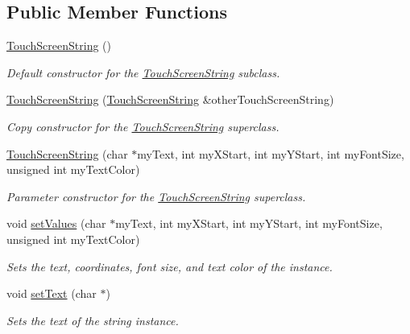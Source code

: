 \subsection*{Public Member Functions}
\begin{DoxyCompactItemize}
\item 
\hypertarget{class_touch_screen_string_ac6041c6c845b2286efee96cbc4b5473f}{\hyperlink{class_touch_screen_string_ac6041c6c845b2286efee96cbc4b5473f}{Touch\+Screen\+String} ()}\label{class_touch_screen_string_ac6041c6c845b2286efee96cbc4b5473f}

\begin{DoxyCompactList}\small\item\em Default constructor for the \hyperlink{class_touch_screen_string}{Touch\+Screen\+String} subclass. \end{DoxyCompactList}\item 
\hyperlink{class_touch_screen_string_a32ccd512fd5ef6a1aefa14d1e7552afb}{Touch\+Screen\+String} (\hyperlink{class_touch_screen_string}{Touch\+Screen\+String} \&other\+Touch\+Screen\+String)
\begin{DoxyCompactList}\small\item\em Copy constructor for the \hyperlink{class_touch_screen_string}{Touch\+Screen\+String} superclass. \end{DoxyCompactList}\item 
\hyperlink{class_touch_screen_string_a225634c4816f8988343c9a9491cf27fb}{Touch\+Screen\+String} (char $\ast$my\+Text, int my\+X\+Start, int my\+Y\+Start, int my\+Font\+Size, unsigned int my\+Text\+Color)
\begin{DoxyCompactList}\small\item\em Parameter constructor for the \hyperlink{class_touch_screen_string}{Touch\+Screen\+String} superclass. \end{DoxyCompactList}\item 
void \hyperlink{class_touch_screen_string_ad797bc5369aaace58de46bca39ae83dd}{set\+Values} (char $\ast$my\+Text, int my\+X\+Start, int my\+Y\+Start, int my\+Font\+Size, unsigned int my\+Text\+Color)
\begin{DoxyCompactList}\small\item\em Sets the text, coordinates, font size, and text color of the instance. \end{DoxyCompactList}\item 
void \hyperlink{class_touch_screen_string_a7d32e2262e4ea1009b029c0ae8b45897}{set\+Text} (char $\ast$)
\begin{DoxyCompactList}\small\item\em Sets the text of the string instance. \end{DoxyCompactList}\item 

\end{DoxyCompactItemize}
